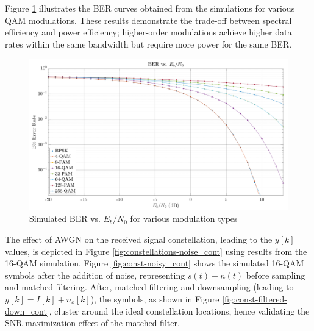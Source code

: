 Figure \ref{fig:ber-mod_cont} illustrates the BER curves obtained from the simulations for various QAM modulations. These results demonstrate the  trade-off between spectral efficiency and power efficiency; higher-order modulations achieve higher data rates within the same bandwidth but require more power for the same BER.

\begin{figure}[H]
    \centering
    \includegraphics[width=0.9\linewidth]{Images/ber-mod.png}
    \caption{Simulated BER vs. $E_b/N_0$ for various modulation types}
    \label{fig:ber-mod_cont}
\end{figure}

The effect of AWGN on the received signal constellation, leading to the $y[k]$ values, is depicted in Figure \ref{fig:constellations-noise_cont} using results from the 16-QAM simulation. Figure \ref{fig:const-noisy_cont} shows the simulated 16-QAM symbols after the addition of noise, representing $s(t)+n(t)$ before sampling and matched filtering. After, matched filtering and downsampling (leading to $y[k]=I[k]+n_o[k]$), the symbols, as shown in Figure \ref{fig:const-filtered-down_cont}, cluster around the ideal constellation locations, hence validating the SNR maximization effect of the matched filter.

